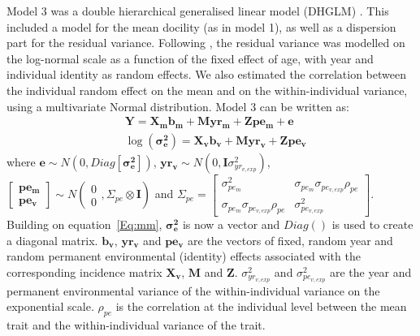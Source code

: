 \documentclass[a4paper,12pt,twoside]{article}
\begin{document}
	Model 3 was a double hierarchical generalised linear model (DHGLM) \citep{lee_double_2006,cleasby_quantifying_2015}.
	This included a model for the mean docility (as in model 1), as well as a dispersion part for the residual variance.
	Following \cite{sancristobal-gaudy_prediction_1998}, the residual variance was modelled on the log-normal scale as a function of the fixed effect of age, with year and individual identity as random effects.
	We also estimated the correlation between the individual random effect on the mean and on the within-individual variance, using a multivariate Normal distribution.
	Model 3 can be written as:
	\begin{equation}\label{Eq:dhm}
		\begin{aligned}
			&\boldsymbol{Y} = \boldsymbol{X_m b_m} + \boldsymbol{M yr_m} + \boldsymbol{Z pe_m} + \boldsymbol{e}\\
			&\log (\boldsymbol{\sigma_e^2}) = \boldsymbol{X_v b_v} + \boldsymbol{M yr_v} + \boldsymbol{Z pe_v}
		\end{aligned}
	\end{equation}
	where $\boldsymbol{e} \sim N \left(0, Diag [ \boldsymbol{\sigma_e^2}] \right) $, $\boldsymbol{yr_v} \sim N \left( 0, \boldsymbol{I}\sigma_{yr_{v,exp}}^2 \right) $, 
	$\begin{bmatrix}
		\boldsymbol{pe_m} \\
		\boldsymbol{pe_v}
	\end{bmatrix}
	\sim N \left(\begin{matrix} 0 \\ 0 \end{matrix}, \Sigma_{pe} \otimes \boldsymbol{I} \right)$
	and
	$\Sigma_{pe} =
	\begin{bmatrix}
		\sigma_{pe_m}^2 & \sigma_{pe_m}\sigma_{pe_{v,exp}}\rho_{pe} \\
		\sigma_{pe_m}\sigma_{pe_{v,exp}}\rho_{pe} & \sigma_{pe_{v,exp}}^2 
	\end{bmatrix}
	$.
	Building on equation~\ref{Eq:mm}, $\boldsymbol{\sigma_e^2}$ is now a vector and $Diag()$ is used to create a diagonal matrix.
	$\boldsymbol{b_v}$, $\boldsymbol{yr_v}$ and $\boldsymbol{pe_v}$ are the vectors of fixed, random year and random permanent environmental (identity) effects associated with the corresponding incidence matrix $\boldsymbol{X_v}$, $\boldsymbol{M}$ and $\boldsymbol{Z}$.
	$\sigma_{yr_{v,exp}}^2$ and $\sigma_{pe_{v,exp}}^2$ are the year and permanent environmental variance of the within-individual variance on the exponential scale.
	$\rho_{pe}$ is the correlation at the individual level between the mean trait and the within-individual variance of the trait.
	
\end{document}
